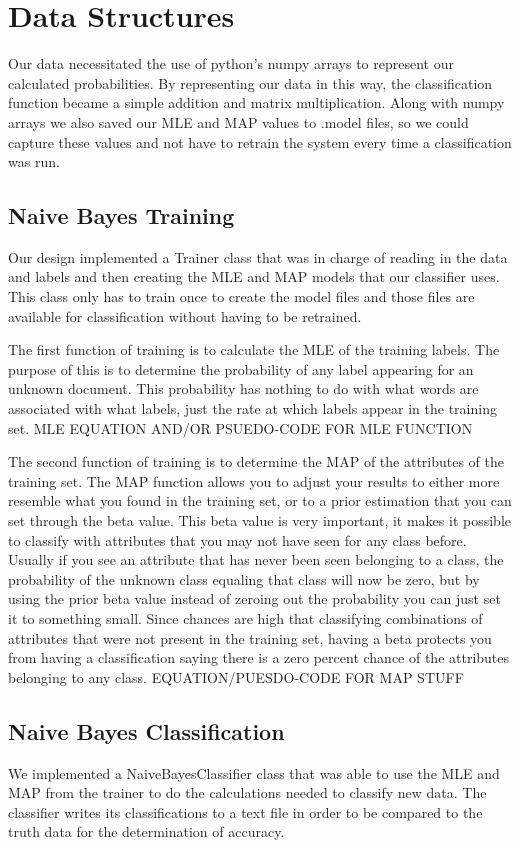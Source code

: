 \documentclass{IEEEtran}
\begin{document}
\section{Data Structures}
Our data necessitated the use of python’s numpy arrays to represent our calculated probabilities. By representing our data in this way, the classification function became a simple addition and matrix multiplication. Along with numpy arrays we also saved our MLE and MAP values to .model files, so we could capture these values and not have to retrain the system every time a classification was run.

\subsection{Naive Bayes Training}
Our design implemented a Trainer class that was in charge of reading in the data and labels and then creating the MLE and MAP models that our classifier uses. This class only has to train once to create the model files and those files are available for classification without having to be retrained. 

The first function of training is to calculate the MLE of the training labels. The purpose of this is to determine the probability of any label appearing for an unknown document. This probability has nothing to do with what words are associated with what labels, just the rate at which labels appear in the training set. {MLE EQUATION AND/OR PSUEDO-CODE FOR MLE FUNCTION}

The second function of training is to determine the MAP of the attributes of the training set. The MAP function allows you to adjust your results to either more resemble what you found in the training set, or to a prior estimation that you can set through the beta value. This beta value is very important, it makes it possible to classify with attributes that you may not have seen for any class before. Usually if you see an attribute that has never been seen belonging to a class, the probability of the unknown class equaling that class will now be zero, but by using the prior beta value instead of zeroing out the probability you can just set it to something small. Since chances are high that classifying combinations of attributes that were not present in the training set, having a beta protects you from having a classification saying there is a zero percent chance of the attributes belonging to any class. {EQUATION/PUESDO-CODE FOR MAP STUFF}

\subsection{Naive Bayes Classification}
We implemented a NaiveBayesClassifier class that was able to use the MLE and MAP from the trainer to do the calculations needed to classify new data. The classifier writes its classifications to a text file in order to be compared to the truth data for the determination of accuracy. 
\end{document}
